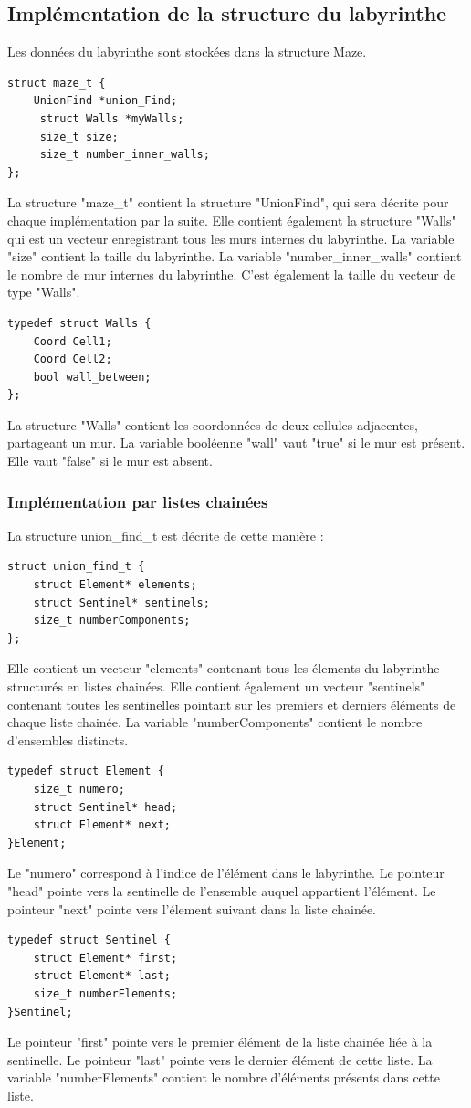 \documentclass[11pt]{article}
\begin{document}
\subsection{Implémentation de la structure du labyrinthe}
Les données du labyrinthe sont stockées dans la structure Maze.
\begin{lstlisting}[style=CStyle]
struct maze_t {
    UnionFind *union_Find;
     struct Walls *myWalls;
     size_t size;
     size_t number_inner_walls;
};
\end{lstlisting}

La structure "maze\_t" contient la structure "UnionFind", qui sera décrite pour chaque implémentation par la suite. Elle contient également la structure "Walls" qui est un vecteur enregistrant tous les murs internes du labyrinthe. La variable "size" contient la taille du labyrinthe. La variable "number\_inner\_walls" contient le nombre de mur internes du labyrinthe. C'est également la taille du vecteur de type "Walls".
\begin{lstlisting}[style=CStyle]
typedef struct Walls {
    Coord Cell1;
    Coord Cell2;
    bool wall_between;
};
\end{lstlisting}
La structure "Walls" contient les coordonnées de deux cellules adjacentes, partageant un mur. La variable booléenne "wall" vaut "true" si le mur est présent. Elle vaut "false" si le mur est absent.

\subsubsection{Implémentation par listes chainées}
La structure union\_find\_t est décrite de cette manière :
\begin{lstlisting}[style=CStyle]
struct union_find_t {
    struct Element* elements;
    struct Sentinel* sentinels;
    size_t numberComponents;
};
\end{lstlisting}
Elle contient un vecteur "elements" contenant tous les élements du labyrinthe structurés en listes chainées. Elle contient également un vecteur "sentinels" contenant toutes les sentinelles pointant sur les premiers et derniers éléments de chaque liste chainée. La variable "numberComponents" contient le nombre d'ensembles distincts.
\begin{lstlisting}[style=CStyle]
typedef struct Element {
    size_t numero;
    struct Sentinel* head;
    struct Element* next;
}Element;
\end{lstlisting}
Le "numero" correspond à l'indice de l'élément dans le labyrinthe. Le pointeur "head" pointe vers la sentinelle de l'ensemble auquel appartient l'élément. Le pointeur "next" pointe vers l'élement suivant dans la liste chainée.
	\begin{lstlisting}[style=CStyle]
typedef struct Sentinel {
    struct Element* first;
    struct Element* last;
    size_t numberElements;
}Sentinel;
\end{lstlisting}
Le pointeur "first" pointe vers le premier élément de la liste chainée liée à la sentinelle. Le pointeur "last" pointe vers le dernier élément de cette liste. La variable "numberElements" contient le nombre d'éléments présents dans cette liste.
\end{document}
